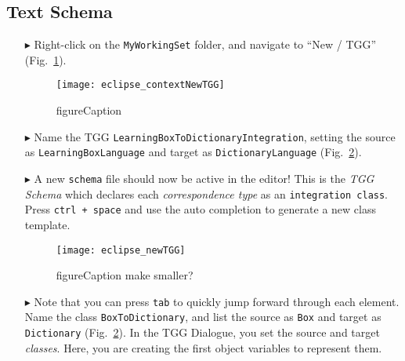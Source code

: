 \newpage
\hypertarget{schema tex}{}
\subsection{Text Schema}
\texHeader


\begin{itemize}

\item[$\blacktriangleright$] Right-click on the \texttt{MyWorkingSet} folder, and navigate to ``New / TGG'' (Fig.~\ref{fig:contextTGG}).

\vspace{0.5cm}

\begin{figure}[htbp]
\begin{center}
  \texttt{[image: eclipse\_contextNewTGG]}
  \caption{figureCaption}
  \label{fig:contextTGG}
\end{center}
\end{figure}

\item[$\blacktriangleright$] Name the TGG \texttt{LearningBoxToDictionaryIntegration}, setting the source as \texttt{LearningBoxLanguage} and target as
\texttt{DictionaryLanguage} (Fig.~\ref{fig:newTGG}).

\item[$\blacktriangleright$] A new \texttt{schema} file should now be active in the editor! This is the \emph{TGG Schema} which declares each
\emph{correspondence type} as an \texttt{integration class}. Press \texttt{ctrl + space} and use the auto completion to generate a new class template.

\newpage

\begin{figure}[htbp]
\begin{center}
  \texttt{[image: eclipse\_newTGG]}
  \caption{figureCaption \update make smaller?}
  \label{fig:newTGG}
\end{center}
\end{figure}

\item[$\blacktriangleright$] Note that you can press \texttt{tab} to quickly jump forward through each element. Name the class \texttt{BoxToDictionary}, and
list the source as \texttt{Box} and target as \texttt{Dictionary} (Fig.~\ref{fig:newTGG}). In the TGG Dialogue, you set the source and target \emph{classes}.
Here, you are creating the first object variables to represent them. 


\end{itemize}
